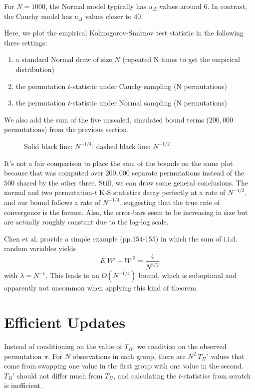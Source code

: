 For $N=1000$, the Normal model typically has $u_{\Delta}$ values around 6.  In contrast, the Cauchy
model has $u_{\Delta}$ values closer to 40.  
\clearpage

Here, we plot the empirical Kolmogorov-Smirnov test statistic in the following three settings:
\begin{enumerate}
\item a standard Normal draw of size $N$ (repeated N times to get the empirical distribution)
\item the permutation $t$-statistic under Cauchy sampling (N permutations)
\item the permutation $t$-statistic under Normal sampling (N permutations)
\end{enumerate}
We also add the sum of the five unscaled, simulated bound terms ($200,000$ permutations) from the
previous section.

\begin{figure}[!ht]
  \centering
  
  \caption{Solid black line: $N^{-1/4}$; dashed black line: $N^{-1/2}$}
\end{figure}

It's not a fair comparison to place the sum of the bounds on the same plot because that was computed
over $200,000$ separate permutations instead of the $500$ shared by the other three.  Still, we can
draw some general conclusions.  The normal and two permutation-$t$ K-S statistics decay perfectly at
a rate of $N^{-1/2}$, and our bound follows a rate of $N^{-1/4}$, suggesting that the true rate of
convergence is the former.  Also, the error-bars seem to be increasing in size but are actually
roughly constant due to the log-log scale.

Chen et al. \cite{chen2010normal} provide a simple example
(pp.154-155) in which the sum of i.i.d. random variables yields
\begin{equation*}
  E|W' - W|^3 = \frac{4}{N^{3/2}}
\end{equation*}
with $\lambda = N^{-1}$.  This leads to an $O(N^{-1/4})$ bound, which is suboptimal and apparently
not uncommon when applying this kind of theorem.

\section{Efficient Updates}
Instead of conditioning on the value of $T_{\Pi}$, we condition on the
observed permutation $\pi$.  For $N$ observations in each group, there
are $N^2 \: T_{\Pi}'$ values that come from swapping one value in the first
group with one value in the second.  $T_{\Pi}'$ should not differ much from
$T_{\Pi}$, and calculating the $t$-statistics from scratch is inefficient.  

